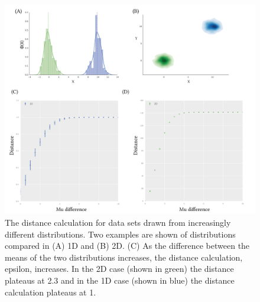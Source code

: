  
\begin{figure}[tb]
\centerfloat
\includegraphics[scale=0.8]{../../chapters/chapterABCFlow/images/mu_diff.png}
\caption[Rangel of distance values obtained using the Wald-Wolfowitz distance]{\label{fig:epsilon_mud}The distance calculation for data sets drawn from increasingly different distributions. Two examples are shown of distributions compared in (A) 1D and (B) 2D. (C) As the difference between the means of the two distributions increases, the distance calculation, epsilon, increases. In the 2D case (shown in green) the distance plateaus at 2.3 and in the 1D case (shown in blue) the distance calculation plateaus at 1.}
\label{fig:normal_example}
\end{figure}


